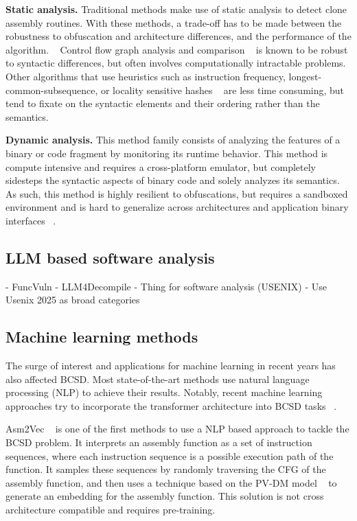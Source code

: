 \textbf{Static analysis.} Traditional methods make use of static analysis to detect clone assembly routines. With these methods, a trade-off has
to be made between the robustness to obfuscation and architecture differences, and the performance of the algorithm. ~\cite{BCSDsurvey}
Control flow graph analysis and comparison ~\cite{BinDiff,graph-bug-search} is known to be robust to syntactic differences, but often
involves computationally intractable problems. Other algorithms that use heuristics such as instruction frequency,
longest-common-subsequence, or locality sensitive hashes ~\cite{clones.net,op-seq,sem-hash} are less time consuming, but tend to fixate on the syntactic
elements and their ordering rather than the semantics.

\textbf{Dynamic analysis.} This method family consists of analyzing the features of a binary or code fragment by monitoring its runtime behavior.
This method is compute intensive and requires a cross-platform emulator, but completely sidesteps the syntactic aspects of binary code
and solely analyzes its semantics. ~\cite{BCSD} As such, this method is highly resilient to obfuscations, but requires a sandboxed environment
and is hard to generalize across architectures and application binary interfaces ~\cite{blanket-exec}.

\subsection{LLM based software analysis}

- FuncVuln
- LLM4Decompile
- Thing for software analysis (USENIX)
- Use Usenix 2025 as broad categories

\subsection{Machine learning methods}

The surge of interest and applications for machine learning in recent years has also affected BCSD.
Most state-of-the-art methods use natural language processing (NLP) to achieve their results.
Notably, recent machine learning approaches try to incorporate the transformer architecture into BCSD tasks ~\cite{CLAP,jtrans,UniASM}.

Asm2Vec ~\cite{Asm2Vec} is one of the first methods to use a NLP based approach to tackle the BCSD problem. It interprets an
assembly function as a set of instruction sequences, where each instruction sequence is a possible execution path
of the function. It samples these sequences by randomly traversing the CFG of the assembly function, and then
uses a technique based on the PV-DM model ~\cite{PV-DM} to generate an embedding for the assembly function. This solution
is not cross architecture compatible and requires pre-training.

